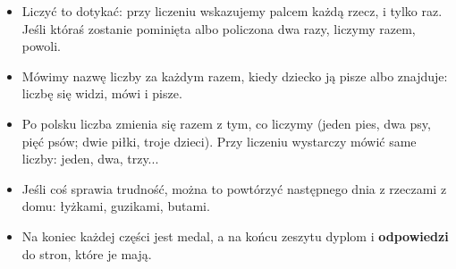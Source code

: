 {\small
\begin{itemize}[leftmargin=6mm, itemsep=1pt, topsep=2pt]
\item Liczyć to dotykać: przy liczeniu wskazujemy palcem każdą rzecz,
  i tylko raz. Jeśli któraś zostanie pominięta albo policzona dwa razy,
  liczymy razem, powoli.
\item Mówimy nazwę liczby za każdym razem, kiedy dziecko ją pisze albo
  znajduje: liczbę się widzi, mówi i pisze.
\item Po polsku liczba zmienia się razem z tym, co liczymy (jeden pies,
  dwa psy, pięć psów; dwie piłki, troje dzieci). Przy liczeniu wystarczy
  mówić same liczby: jeden, dwa, trzy...
\item Jeśli coś sprawia trudność, można to powtórzyć następnego dnia z
  rzeczami z domu: łyżkami, guzikami, butami.
\item Na koniec każdej części jest medal, a na końcu zeszytu dyplom i
  \textbf{odpowiedzi} do stron, które je mają.
\end{itemize}}
\newpage
